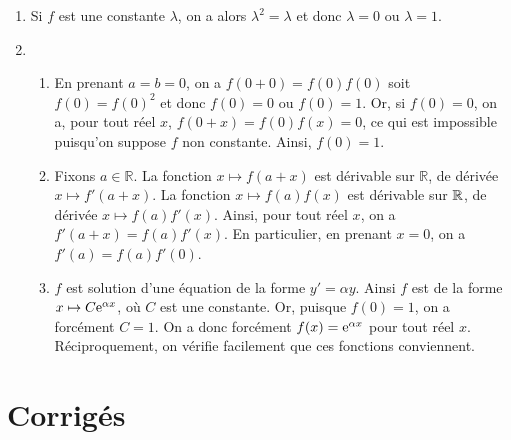 \documentclass[11pt,fleqn, openany]{book} %
\begin{document}
\begin{solution}\hspace{0pt}

\begin{enumerate}
\item Si $f$ est une constante $\lambda$, on a alors $\lambda ^2 = \lambda$ et donc $\lambda=0$ ou $\lambda = 1$.
\item \begin{enumerate}
\item En prenant $a=b=0$, on a $f(0+0)=f(0)f(0)$ soit $f(0)=f(0)^2$ et donc $f(0)=0$ ou $f(0)=1$. Or, si $f(0)=0$, on a, pour tout réel $x$, $f(0+x)=f(0)f(x)=0$, ce qui est impossible puisqu'on suppose $f$ non constante. Ainsi, $f(0)=1$.
\item Fixons $a\in\mathbb{R}$. La fonction $x\mapsto f(a+x)$ est dérivable sur $\mathbb{R}$, de dérivée $x\mapsto f'(a+x)$. La fonction $x\mapsto f(a)f(x)$ est dérivable sur $\mathbb{R}$, de dérivée $x\mapsto f(a)f'(x)$. Ainsi, pour tout réel $x$, on a $f'(a+x)=f(a)f'(x)$. En particulier, en prenant $x=0$, on a $f'(a)=f(a)f'(0)$.
\item $f$ est solution d'une équation de la forme $y'=\alpha y$. Ainsi $f$ est de la forme $x\mapsto C\mathrm{e}^{\alpha x}$, où $C$ est une constante. Or, puisque $f(0)=1$, on a forcément $C=1$. On a donc forcément $f(x)=\mathrm{e}^{\alpha x}$ pour tout réel $x$. Réciproquement, on vérifie facilement que ces fonctions conviennent.
\end{enumerate}
\end{enumerate}

\end{solution}



\chapter{Corrigés}



\printsolutions[headings={false} ]
\end{document}

